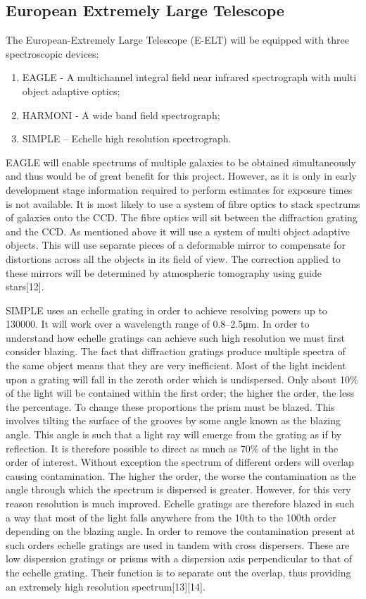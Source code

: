 		\subsection{European Extremely Large Telescope} %
		\label{sub:european_extremely_large_telescope}
			The European-Extremely Large Telescope (E-ELT) will be equipped with three spectroscopic devices:
			\begin{enumerate}
				\item EAGLE - A multichannel integral field near infrared spectrograph with multi object adaptive optics;
				\item HARMONI - A wide band field spectrograph;
				\item SIMPLE – Echelle high resolution spectrograph.
			\end{enumerate}
			EAGLE will enable spectrums of multiple galaxies to be obtained simultaneously and thus would be of great benefit for this project. However, as it is only in early development stage information required to perform estimates for exposure times is not available. It is most likely to use a system of fibre optics to stack spectrums of galaxies onto the CCD. The fibre optics will sit between the diffraction grating and the CCD. As mentioned above it will use a system of multi object adaptive objects. This will use separate pieces of a deformable mirror to compensate for distortions across all the objects in its field of view. The correction applied to these mirrors will be determined by atmospheric tomography using guide stars\cite{}[12].

			SIMPLE uses an echelle grating in order to achieve resolving powers up to \num{130000}. It will work over a wavelength range of 0.8--2.5\si{\micro\metre}. In order to understand how echelle gratings can achieve such high resolution we must first consider blazing. The fact that diffraction gratings produce multiple spectra of the same object means that they are very inefficient. Most of the light incident upon a grating will fall in the zeroth order which is undispersed. Only about 10\% of the light will be contained within the first order; the higher the order, the less the percentage. To change these proportions the prism must be blazed. This involves tilting the surface of the grooves by some angle known as the blazing angle. This angle is such that a light ray will emerge from the grating as if by reflection. It is therefore possible to direct as much as 70\% of the light in the order of interest. Without exception the spectrum of different orders will overlap causing contamination. The higher the order, the worse the contamination as the angle through which the spectrum is dispersed is greater. However, for this very reason resolution is much improved. Echelle gratings are therefore blazed in such a way that most of the light falls anywhere from the 10th to the 100th order depending on the blazing angle. In order to remove the contamination present at such orders echelle gratings are used in tandem with cross dispersers. These are low dispersion gratings or prisms with a dispersion axis perpendicular to that of the echelle grating. Their function is to separate out the overlap, thus providing an extremely high resolution spectrum\cite{}[13]\cite{}[14].

